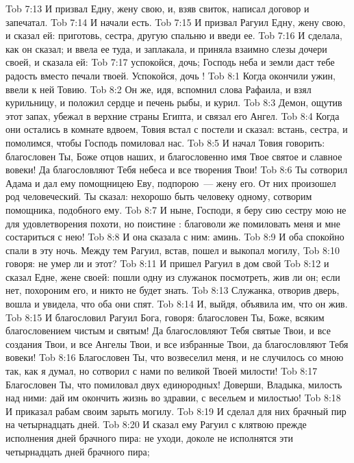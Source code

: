 \vs Tob 7:13 И призвал Едну, жену свою, и, взяв свиток, написал договор и запечатал.
\vs Tob 7:14 И начали есть.
\vs Tob 7:15 И призвал Рагуил Едну, жену свою, и сказал ей: приготовь, сестра, другую спальню и введи ее.
\vs Tob 7:16 И сделала, как он сказал; и ввела ее туда, и заплакала, и приняла взаимно слезы дочери своей, и сказала ей:
\vs Tob 7:17 успокойся, дочь; Господь неба и земли даст тебе радость вместо печали твоей. Успокойся, дочь !
\vs Tob 8:1 Когда окончили ужин, ввели к ней Товию.
\vs Tob 8:2 Он же, идя, вспомнил слова Рафаила, и взял курильницу, и положил сердце и печень рыбы, и курил.
\vs Tob 8:3 Демон, ощутив этот запах, убежал в верхние страны Египта, и связал его Ангел.
\rsbpar\vs Tob 8:4 Когда они остались в комнате вдвоем, Товия встал с постели и сказал: встань, сестра, и помолимся, чтобы Господь помиловал нас.
\vs Tob 8:5 И начал Товия говорить: благословен Ты, Боже отцов наших, и благословенно имя Твое святое и славное вовеки! Да благословляют Тебя небеса и все творения Твои!
\vs Tob 8:6 Ты сотворил Адама и дал ему помощницею Еву, подпорою~--- жену его. От них произошел род человеческий. Ты сказал: нехорошо быть человеку одному, сотворим помощника, подобного ему.
\vs Tob 8:7 И ныне, Господи, я беру сию сестру мою не для удовлетворения похоти, но поистине : благоволи же помиловать меня и  мне состариться с нею!
\vs Tob 8:8 И она сказала с ним: аминь.
\vs Tob 8:9 И оба спокойно спали в эту ночь. Между тем Рагуил, встав, пошел и выкопал могилу,
\vs Tob 8:10 говоря: не умер ли и этот?
\vs Tob 8:11 И пришел Рагуил в дом свой
\vs Tob 8:12 и сказал Едне, жене своей: пошли одну из служанок посмотреть, жив ли он; если нет, похороним его, и никто не будет знать.
\vs Tob 8:13 Служанка, отворив дверь, вошла и увидела, что оба они спят.
\vs Tob 8:14 И, выйдя, объявила им, что он жив.
\rsbpar\vs Tob 8:15 И благословил Рагуил Бога, говоря: благословен Ты, Боже, всяким благословением чистым и святым! Да благословляют Тебя святые Твои, и все создания Твои, и все Ангелы Твои, и все избранные Твои, да благословляют Тебя вовеки!
\vs Tob 8:16 Благословен Ты, что возвеселил меня, и не случилось со мною так, как я думал, но сотворил с нами по великой Твоей милости!
\vs Tob 8:17 Благословен Ты, что помиловал двух единородных! Доверши, Владыка, милость над ними: дай им окончить жизнь во здравии, с весельем и милостью!
\vs Tob 8:18 И приказал рабам своим зарыть могилу.
\vs Tob 8:19 И сделал для них брачный пир на четырнадцать дней.
\vs Tob 8:20 И сказал ему Рагуил с клятвою прежде исполнения дней брачного пира: не уходи, доколе не исполнятся эти четырнадцать дней брачного пира;
